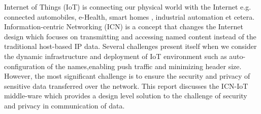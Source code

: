  Internet of Things (IoT) is connecting our physical world with the Internet e.g. connected automobiles, e-Health, smart homes , industrial automation et cetera. Information-centric Networking (ICN) is a concept that changes the Internet design which focuses on transmitting and accessing named content instead of the traditional host-based IP data. Several challenges present itself when we consider the dynamic infrastructure and deployment of IoT environment such as auto-configuration of the names,enabling push traffic and minimizing header size. However, the most significant challenge is to ensure the security and privacy of sensitive data transferred over the network. This report discusses the ICN-IoT middle-ware which provides a design level solution to the challenge of security and privacy in communication of data.

